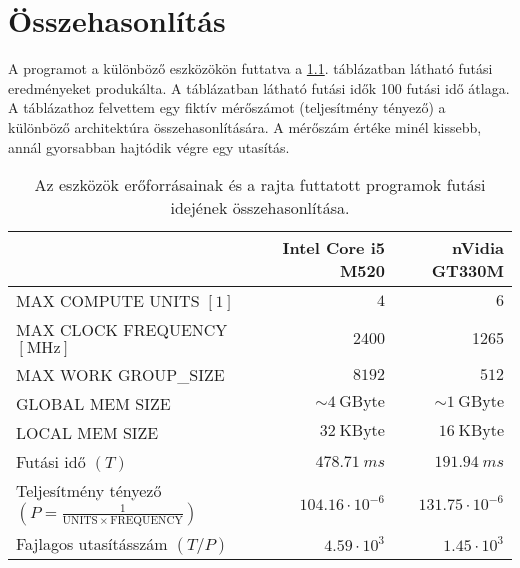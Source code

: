 \chapter{Összehasonlítás}
	A programot a különböző eszközökön futtatva a \ref{table:results}. táblázatban látható futási
	eredményeket produkálta. A táblázatban látható futási idők 100 futási idő átlaga.
	A táblázathoz felvettem egy fiktív mérőszámot (teljesítmény tényező) a különböző architektúra
	összehasonlítására.
	A mérőszám értéke minél kissebb, annál gyorsabban hajtódik végre egy utasítás.
	\begin{table}[H]
	\footnotesize
	\centering
	\caption[Eszközök futási idejének összehasonlítása]{Az eszközök erőforrásainak és a rajta futtatott
	programok futási idejének összehasonlítása.}
	\label{table:results}
	\setlength{\extrarowheight}{8pt}
	\begin{tabular}{ l | r | r}
		 & Intel Core i5 M520 & nVidia GT330M \\ \hline
		MAX COMPUTE UNITS $[1]$ & $4$ & $6$\\
		MAX CLOCK FREQUENCY $[\mathrm{MHz}]$ & 2400 & 1265 \\
		MAX WORK GROUP\_SIZE & $8192$ & $512$ \\ \hline\hline
		GLOBAL MEM SIZE & $\sim 4\ \mathrm{GByte}$ & $\sim 1\ \mathrm{GByte}$\\
		LOCAL MEM SIZE & $32\ \mathrm{KByte}$ & $16\ \mathrm{KByte}$\\ \hline\hline
		Futási idő $(T)$ & $478.71\ ms$ & $191.94\ ms$\\
		Teljesítmény tényező $\left(P=\frac{1}{\mathrm{UNITS}\times \mathrm{FREQUENCY}}\right)$ &
		$104.16\cdot 10^{-6}$ & $131.75\cdot 10^{-6}$\\
		Fajlagos utasításszám $(T/P)$ &  $4.59\cdot 10^3$ & $1.45\cdot 10^3$ 
	\end{tabular}
	\end{table}
